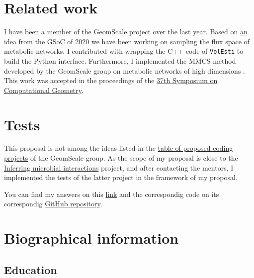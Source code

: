 \documentclass{article}
\begin{document}
\section{Related work}

I have been a member of the GeomScale project over the last year.
Based on \href{https://github.com/GeomScale/gsoc2020/wiki/High-dimensional-sampling-with-applications-to-structural-biology}{an idea from the GSoC of 2020} we have been working on sampling the flux space of metabolic networks. 
I contributed with wrapping the C++ code of \texttt{VolEsti} to build the Python interface.
Furthermore, I implemented the MMCS method developed by the GeomScale group on metabolic networks of high dimensions \cite{chalkis2020geometric}. 
This work was accepted in the proceedings of the \href{https://cse.buffalo.edu/socg21/accepted.html}{37th Symposium on Computational Geometry}.



\section{Tests}
This proposal is not among the ideas listed in the 
\href{https://github.com/GeomScale/gsoc2021/wiki/table-of-proposed-coding-projects}{table of proposed coding projects} of the GeomScale group. 
As the scope of my proposal is close to the \href{https://github.com/GeomScale/gsoc2021/wiki/Inferring-microbial-interactions}{Inferring microbial interactions} project, 
and after contacting the mentors, 
I implemented the tests of the latter project in the framework of my proposal.

You can find my answers on this \href{https://hariszaf.github.io/gsoc2021/}{link} 
and the correspondig code on its correspondig \href{https://github.com/hariszaf/gsoc2021}{GitHub repository}.



\section{Biographical information}
\subsection{Education}
\end{document}

